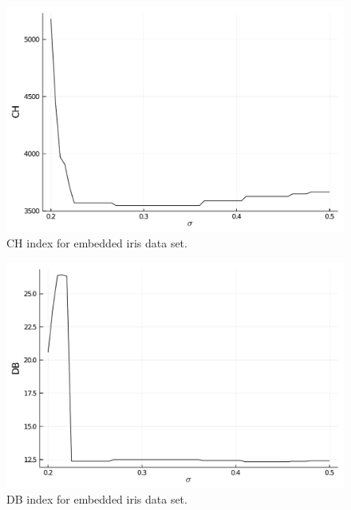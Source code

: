 \documentclass[conference]{IEEEtran}
\theoremstyle{definition}
\theoremstyle{remark}
\theoremstyle{remark}
\begin{document}
\begin{figure}[t]
  \centering
  \includegraphics[scale=.35]{figs/iris/exploring-2d-emb-ch}
  \caption{CH index for embedded iris data set.}
  \label{fig:expembch}
\end{figure}

\begin{figure}[t]
  \centering
  \includegraphics[scale=.35]{figs/iris/exploring-2d-emb-db}
  \caption{DB index for embedded iris data set.}
  \label{fig:expembdb}
\end{figure}
\end{document}
